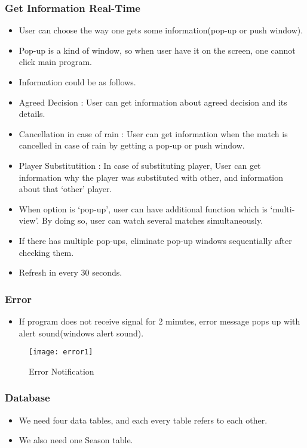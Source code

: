 \documentclass[conference,compsoc, twocolumn]{IEEEtran}
\begin{document}
\subsubsection{Get Information Real-Time}
\begin{itemize}
\item User can choose the way one gets some information(pop-up or push window).
\item Pop-up is a kind of window, so when user have it on the screen, one cannot click main program.
\item Information could be as follows.
\item Agreed Decision : User can get information about agreed decision and its details.
\item Cancellation in case of rain : User can get information when the match is cancelled in case of rain by getting a pop-up or push window.
\item Player Substitutition : In case of substituting player, User can get information why the player was substituted with other, and information about that ‘other’  player.
\item When option is ‘pop-up’, user can have additional function which is ‘multi-view’.  By doing so, user can watch several matches simultaneously.
\item If there has multiple pop-ups, eliminate pop-up windows sequentially after checking them.
\item Refresh in every 30 seconds.
\end{itemize}



\subsubsection{Error}
\begin{itemize}
\item  If program does not receive signal for 2 minutes, error message pops up with alert sound(windows alert sound).
\end{itemize}
\begin{figure}[H]
\centering\texttt{[image: error1]}
\caption{Error Notification}
\end{figure}

\subsubsection{Database}
\begin{itemize}
\item We need four data tables, and each every table refers to each other.
\item We also need one Season table.
\end{itemize}
\end{document}
